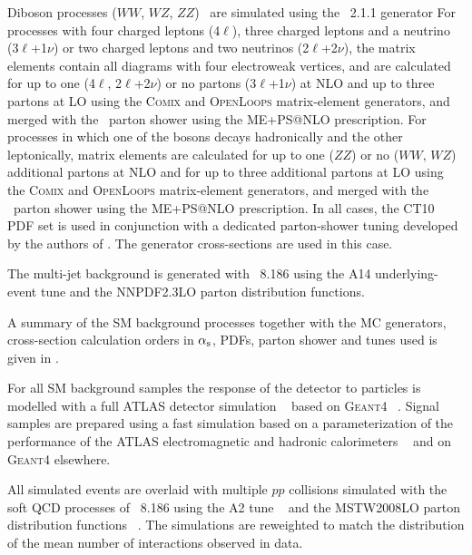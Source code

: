 {Diboson processes ($WW$, $WZ$, $ZZ$)~\cite{ATL-PHYS-PUB-2016-002} are simulated using the  \sherpa~2.1.1 generator
For processes with four charged leptons (4$\ell$), three charged leptons and a neutrino (3$\ell$+1$\nu$) or two charged leptons and two neutrinos (2$\ell$+2$\nu$), the matrix elements contain all diagrams with four electroweak vertices, and are calculated for up to one (4$\ell$, 2$\ell$+2$\nu$) or no partons (3$\ell$+1$\nu$) at NLO and up to three partons at LO using the \textsc{Comix} and \textsc{OpenLoops} matrix-element generators, and merged with the \sherpa\ parton shower using the ME+PS@NLO prescription.
For processes in which one of the bosons decays hadronically and the other leptonically, matrix elements are calculated for up to one ($ZZ$) or no ($WW$, $WZ$) additional partons at NLO and for up to three additional partons at LO using the \textsc{Comix} and \textsc{OpenLoops} matrix-element generators, and merged with the \sherpa\ parton shower using the ME+PS@NLO prescription.
In all cases, the CT10 PDF set is used in conjunction with a dedicated parton-shower tuning developed by the authors of  \sherpa.
The generator cross-sections are used in this case.

The multi-jet background is generated with \pythia~8.186 using the A14 underlying-event tune and the NNPDF2.3LO parton distribution functions.

A summary of the SM background processes together with the MC generators, cross-section calculation orders in $\alpha_{\textrm s}$, PDFs, parton shower and tunes used is given in .
}


For all SM background samples the response of the detector to particles is modelled with a full ATLAS detector simulation ~\cite{:2010wqa} based on \textsc{Geant4} ~\cite{Agostinelli:2002hh}.
Signal samples are prepared using a fast simulation based on a parameterization of the performance of the ATLAS electromagnetic and hadronic calorimeters ~\cite{ATLAS:2010bfa} and on \textsc{Geant4} elsewhere.

All simulated events are overlaid with multiple $pp$ collisions simulated with the soft QCD processes of \pythia~8.186 using the A2 tune  ~\cite{A14tune} and the MSTW2008LO parton distribution functions ~\cite{Martin:2009iq}. The simulations are reweighted to match the distribution of the mean number of interactions observed in data. %

